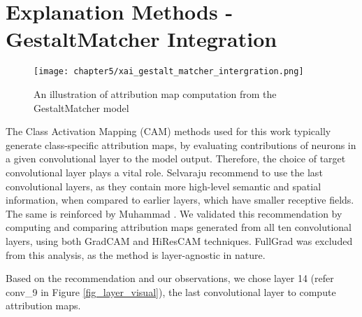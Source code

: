 \documentclass[../report.tex]{subfiles}
\begin{document}
    \section{Explanation Methods - GestaltMatcher Integration}
     \begin{figure}[H]
    	\hspace*{0.5cm}      
    	\texttt{[image: chapter5/xai\_gestalt\_matcher\_intergration.png]}
    	\caption{An illustration of attribution map computation from the GestaltMatcher model}
    	\label{fig_gm_pipeline}
    \end{figure}
	The Class Activation Mapping (CAM) methods used for this work typically generate class-specific attribution maps, by evaluating contributions of neurons in a given convolutional layer to the model output. Therefore, the choice of target convolutional layer plays a vital role. Selvaraju \etal \cite{selvaraju2017grad} recommend to use the last convolutional layers, as they contain more high-level semantic and spatial information, when compared to earlier layers, which have smaller receptive fields. The same is reinforced by Muhammad \etal \cite{muhammad2020eigen}. We validated this recommendation by computing and comparing attribution maps generated from all ten convolutional layers, using both GradCAM and HiResCAM techniques. FullGrad was excluded from this analysis, as the method is layer-agnostic in nature.

	Based on the recommendation and our observations, we chose layer 14 (refer conv\_9 in Figure \ref{fig_layer_visual}), the last convolutional layer to compute attribution maps.\\
\end{document}
